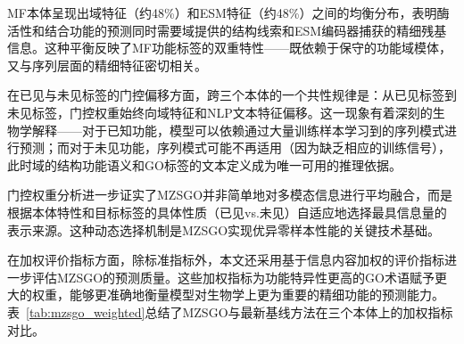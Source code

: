 MF本体呈现出域特征（约48\%）和ESM特征（约48\%）之间的均衡分布，表明酶活性和结合功能的预测同时需要域提供的结构线索和ESM编码器捕获的精细残基信息。这种平衡反映了MF功能标签的双重特性——既依赖于保守的功能域模体，又与序列层面的精细特征密切相关。

在已见与未见标签的门控偏移方面，跨三个本体的一个共性规律是：从已见标签到未见标签，门控权重始终向域特征和NLP文本特征偏移。这一现象有着深刻的生物学解释——对于已知功能，模型可以依赖通过大量训练样本学习到的序列模式进行预测；而对于未见功能，序列模式可能不再适用（因为缺乏相应的训练信号），此时域的结构功能语义和GO标签的文本定义成为唯一可用的推理依据。

门控权重分析进一步证实了MZSGO并非简单地对多模态信息进行平均融合，而是根据本体特性和目标标签的具体性质（已见vs.未见）自适应地选择最具信息量的表示来源。这种动态选择机制是MZSGO实现优异零样本性能的关键技术基础。

在加权评价指标方面，除标准指标外，本文还采用基于信息内容加权的评价指标进一步评估MZSGO的预测质量。这些加权指标为功能特异性更高的GO术语赋予更大的权重，能够更准确地衡量模型对生物学上更为重要的精细功能的预测能力。表~\ref{tab:mzsgo_weighted}总结了MZSGO与最新基线方法在三个本体上的加权指标对比。

\begin{table}[htbp]
\centering
\caption{加权评价指标（$wF_{max}$、$wAUPR$和$S_{min}$）在三个GO本体上的对比。$S_{min}$越低表示性能越好。}
\label{tab:mzsgo_weighted}
\small
{}
\end{table}

